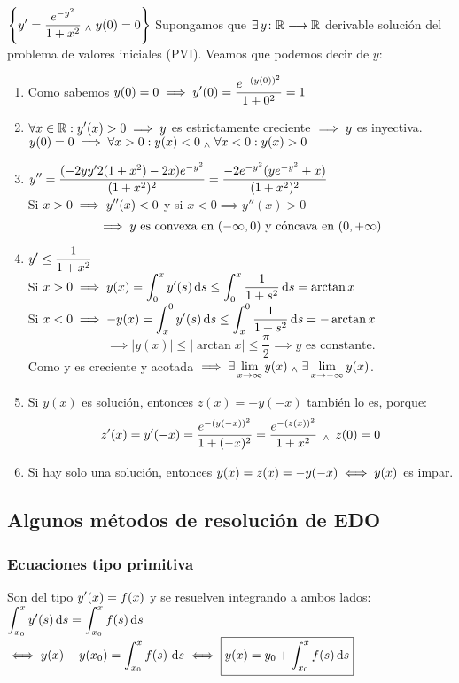 \begin{ejem}
	$\displaystyle \left\{y' = \frac{e^{-y^2}}{1+x^2} \; _{\wedge} \; y(0)=0\right\}$
	Supongamos que $\displaystyle\exists\,y \colon \mathbb{R} \longrightarrow \mathbb{R}$ derivable solución del problema de valores iniciales (PVI). Veamos que podemos decir de $y$:
	\begin{enumerate}
		\item Como sabemos $\displaystyle y(0)=0 \implies y'(0)=\frac{e^{-(y(0))^2}}{1+0^2}=1$
		\item $\displaystyle \forall x \in \mathbb{R} : y'(x)>0 \implies y$ es estrictamente creciente $\displaystyle\implies y$ es inyectiva. \\
		$\displaystyle y(0)=0 \implies \forall x>0 : y(x)<0 \; _{\wedge} \; \forall x<0 : y(x)>0$
		\item $\displaystyle y''=\frac{(-2yy'2(1+x^2)-2x)e^{-y^2}}{(1+x^2)^2}=\frac{-2e^{-y^2}(ye^{-y^2}+x)}{(1+x^2)^2}$ \\
		Si $\displaystyle x>0 \implies y''(x)<0$ y si $x<0 \implies y''(x)>0$
		\[ \implies y \text{ es convexa en } (-\infty, 0) \text{ y cóncava en }(0, +\infty)\]
		\item $\displaystyle y' \leq \frac{1}{1+x^2}$ \\
		Si $\ds x>0 \implies y(x)=\int_0^x y'(s)\odif{s}\leq\int_0^x \frac{1}{1+s^2}\odif{s}=\arctan{x}$ \\
		Si $\ds x<0 \implies -y(x)=\int_x^0 y'(s)\odif{s}\leq\int_x^0 \frac{1}{1+s^2}\odif{s}=-\arctan{x}$ \\
		\[\implies |y(x)| \leq |\arctan{x}| \leq \frac{\pi}{2} \implies y \text{ es constante.}\]
		Como y es creciente y acotada $\displaystyle\implies \exists\lim_{x\to\infty} y(x) \; _{\wedge} \; \exists\lim_{x\to-\infty} y(x)$.
		\item Si $y(x)$ es solución, entonces $z(x)=-y(-x)$ también lo es, porque:
		\[z'(x)=y'(-x)=\frac{e^{-(y(-x))^2}}{1+(-x)^2}=\frac{e^{-(z(x))^2}}{1+x^2} \,\; _{\wedge} \; \, z(0)=0\]
		\item Si hay solo una solución, entonces $\displaystyle y(x)=z(x)=-y(-x)\iff y(x)$ es impar.
	\end{enumerate}
	\ifdraft{\vspace{5cm}}{}
\end{ejem}
\subsection{Algunos métodos de resolución de EDO}
\subsubsection{Ecuaciones tipo primitiva}
Son del tipo $\displaystyle y'(x)=f(x)$ y se resuelven integrando a ambos lados: $\ds \int_{x_0}^x y'(s)\odif{s}=\int_{x_0}^x f(s) \odif{s}$
$\ds \iff y(x)-y(x_0)=\int_{x_0}^x f(s) \,\odif{s} \iff \boxed{y(x) = y_0 + \int_{x_0}^x f(s)\odif{s}}$
